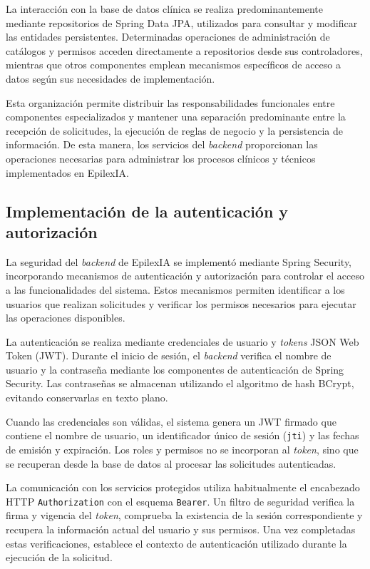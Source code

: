 La interacción con la base de datos
clínica se realiza predominantemente
mediante repositorios de Spring Data JPA,
utilizados para consultar y modificar
las entidades persistentes. Determinadas
operaciones de administración de catálogos
y permisos acceden directamente a
repositorios desde sus controladores,
mientras que otros componentes emplean
mecanismos específicos de acceso a datos
según sus necesidades de implementación.

Esta organización permite distribuir
las responsabilidades funcionales entre
componentes especializados y mantener
una separación predominante entre la
recepción de solicitudes, la ejecución
de reglas de negocio y la persistencia
de información. De esta manera, los
servicios del \textit{backend} proporcionan
las operaciones necesarias para
administrar los procesos clínicos
y técnicos implementados en EpilexIA.


\subsection{Implementación de la autenticación y autorización}

La seguridad del \textit{backend} de EpilexIA se implementó mediante
Spring Security, incorporando mecanismos de autenticación
y autorización para controlar el acceso a las funcionalidades
del sistema. Estos mecanismos permiten identificar a los
usuarios que realizan solicitudes y verificar los permisos
necesarios para ejecutar las operaciones disponibles.

La autenticación se realiza mediante credenciales de usuario
y \textit{tokens} JSON Web Token (JWT). Durante el inicio de sesión,
el \textit{backend} verifica el nombre de usuario y la contraseña
mediante los componentes de autenticación de Spring Security.
Las contraseñas se almacenan utilizando el algoritmo de
hash BCrypt, evitando conservarlas en texto plano.

Cuando las credenciales son válidas, el sistema genera un
JWT firmado que contiene el nombre de usuario, un
identificador único de sesión (\texttt{jti}) y las fechas
de emisión y expiración. Los roles y permisos no se
incorporan al \textit{token}, sino que se recuperan desde la base
de datos al procesar las solicitudes autenticadas.

La comunicación con los servicios protegidos utiliza
habitualmente el encabezado HTTP \texttt{Authorization}
con el esquema \texttt{Bearer}. Un filtro de seguridad
verifica la firma y vigencia del \textit{token}, comprueba la
existencia de la sesión correspondiente y recupera la
información actual del usuario y sus permisos. Una vez
completadas estas verificaciones, establece el contexto
de autenticación utilizado durante la ejecución de la
solicitud.


